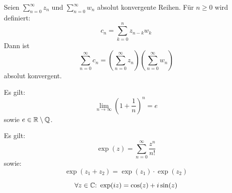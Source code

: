 \begin{framedthm}
	Seien $\sum_{n=0}^{\infty} z_n$ und $\sum_{n=0}^{\infty} w_n$ absolut konvergente Reihen. Für $n\geq 0$ wird definiert: \[c_n = \sum_{k=0}^{n} z_{n-k} w_k\]
	Dann ist \[\sum_{n=0}^{\infty} c_n = \left(\sum_{n=0}^{\infty} z_n\right)\left(\sum_{n=0}^{\infty} w_n\right)\] absolut konvergent.
\end{framedthm}

\begin{framedthm}
	Es gilt:
	\[\lim_{n \to \infty} \left(1+ \frac{1}{n}\right)^n = e\]
	sowie $e \in \mathbb{R} \setminus \mathbb{Q}$.
\end{framedthm}

\begin{framedthm}
	Es gilt:
	\[\exp(z) = \sum_{n=0}^{\infty} \frac{z^n}{n!}\]
	sowie:
	\[\exp(z_1+z_2) = \exp(z_1)\cdot\exp(z_2)\]
\end{framedthm}

\begin{framedthm}
	\[\forall z \in \mathbb{C}{:}\  \exp(iz) = \cos(z) + i \sin(z)\]
\end{framedthm}
